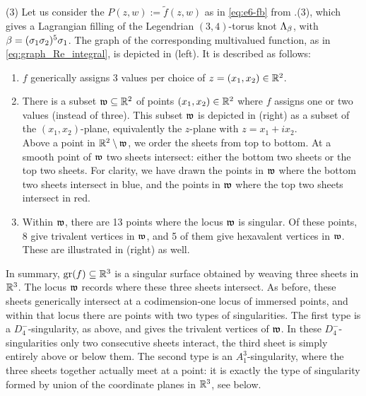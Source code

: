 \begin{example}
\noindent (3) Let us consider the $P(z,w):=\tilde{f}(z,w)$ as in \eqref{eq:e6-fb} from .(3), which gives a Lagrangian filling of the Legendrian $(3,4)$-torus knot $\Lambda_{\beta}$, with $\beta=(\sigma_1\sigma_2)^5\sigma_1$. The graph of the corresponding multivalued function, as in \eqref{eq:graph_Re_integral}, is depicted in  (left). It is described as follows:
\begin{enumerate}[label=$(\roman*)$]
    \item $f$ generically assigns 3 values per choice of $z=(x_1,x_2)\in\mathbb{R}^2$.\\
    \item There is a subset $\mathfrak{w}\subseteq\mathbb{R}^2$ of points $(x_1,x_2)\in\mathbb{R}^2$ where $f$ assigns one or two values (instead of three). This subset $\mathfrak{w}$ is depicted in  (right) as a subset of the $(x_1,x_2)$-plane, equivalently the $z$-plane with $z=x_1+ix_2$.\\

    Above a point in $\mathbb{R}^2\setminus\mathfrak{w}$, we order the sheets from top to bottom. At a smooth point of $\mathfrak{w}$ two sheets intersect: either the bottom two sheets or the top two sheets. For clarity, we have drawn the points in $\mathfrak{w}$ where the bottom two sheets intersect in blue, and the points in $\mathfrak{w}$ where the top two sheets intersect in red.\\
    
    \item Within $\mathfrak{w}$, there are 13 points where the locus $\mathfrak{w}$ is singular. Of these points, 8 give trivalent vertices in $\mathfrak{w}$, and 5 of them give hexavalent vertices in $\mathfrak{w}$. These are illustrated in  (right) as well.\\
\end{enumerate}
\noindent In summary, $\operatorname{gr}(f)\subseteq\mathbb{R}^3$ is a singular surface obtained by weaving three sheets in $\mathbb{R}^3$. The locus $\mathfrak{w}$ records where these three sheets intersect. As before, these sheets generically intersect at a codimension-one locus of immersed points, and within that locus there are points with two types of singularities. The first type is a $D_4^-$-singularity, as above, and gives the trivalent vertices of $\mathfrak{w}$. In these $D_4^-$-singularities only two consecutive sheets interact, the third sheet is simply entirely above or below them. The second type is an $A_1^3$-singularity, where the three sheets together actually meet at a point: it is exactly the type of singularity formed by union of the coordinate planes in $\mathbb{R}^3$, see  below.\sbs
\end{example}

